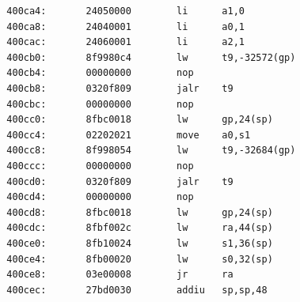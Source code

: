 \documentclass[11pt]{article}
\begin{document}
\begin{verbatim}
  400ca4:       24050000        li      a1,0
  400ca8:       24040001        li      a0,1
  400cac:       24060001        li      a2,1
  400cb0:       8f9980c4        lw      t9,-32572(gp)
  400cb4:       00000000        nop
  400cb8:       0320f809        jalr    t9
  400cbc:       00000000        nop
  400cc0:       8fbc0018        lw      gp,24(sp)
  400cc4:       02202021        move    a0,s1
  400cc8:       8f998054        lw      t9,-32684(gp)
  400ccc:       00000000        nop
  400cd0:       0320f809        jalr    t9
  400cd4:       00000000        nop
  400cd8:       8fbc0018        lw      gp,24(sp)
  400cdc:       8fbf002c        lw      ra,44(sp)
  400ce0:       8fb10024        lw      s1,36(sp)
  400ce4:       8fb00020        lw      s0,32(sp)
  400ce8:       03e00008        jr      ra
  400cec:       27bd0030        addiu   sp,sp,48


\end{verbatim}
\end{document}
